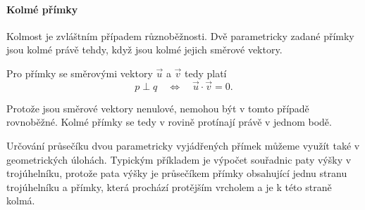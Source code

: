 \paragraph{Kolmé přímky}

Kolmost je zvláštním případem různoběžnosti. Dvě parametricky zadané
přímky jsou kolmé právě tehdy, když jsou kolmé jejich směrové vektory.

Pro přímky se směrovými vektory $\vec{u}$ a $\vec{v}$ tedy platí
\[
    p\perp q
    \quad\Longleftrightarrow\quad
    \vec{u}\cdot\vec{v}=0.
\]

Protože jsou směrové vektory nenulové, nemohou být v tomto případě
rovnoběžné. Kolmé přímky se tedy v rovině protínají právě v jednom
bodě.

Určování průsečíku dvou parametricky vyjádřených přímek můžeme využít
také v geometrických úlohách. Typickým příkladem je výpočet souřadnic
paty výšky v trojúhelníku, protože pata výšky je průsečíkem přímky
obsahující jednu stranu trojúhelníku a přímky, která prochází protějším
vrcholem a je k této straně kolmá.


